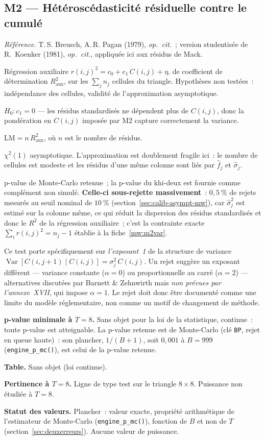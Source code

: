 \documentclass[a4paper,11pt]{article}
\newcommand{\code}[1]{\texttt{\small #1}}
\newcommand{\refl}[1]{{\small\textcolor{maincolor!70!black}{\textit{Référence.} #1}}\par\smallskip}
\newcounter{ficheid}
\newenvironment{fiche}[1]{%
  \stepcounter{ficheid}%
  \phantomsection
  \subsection{#1}%
  \label{fiche:\theficheid}%
}{%
  \end{description}\vspace{0.5em}%
}
\newcommand{\Cadre}{%
  \begin{description}[leftmargin=0pt, style=unboxed, itemsep=3pt, topsep=3pt, parsep=2pt]%
  \item[\textcolor{financeblue}{\textbf{1. Cadre, notations et hypothèses de validité (non testées).}}]}
\newcommand{\Hzero}{\item[\textcolor{financeblue}{\textbf{2. Hypothèse nulle.}}]}
\newcommand{\Stat}{\item[\textcolor{financeblue}{\textbf{3. Statistique de test.}}]}
\newcommand{\Loi}{\item[\textcolor{financeblue}{\textbf{4. Loi sous $H_0$.}}]}
\newcommand{\Pval}{\item[\textcolor{financeblue}{\textbf{5. p-value.}}]}
\newcommand{\Usage}{\item[\textcolor{financeblue}{\textbf{6. Usage et limites.}}]}
\newcommand{\Pertinence}{\item[\textcolor{financeblue}{\textbf{7. Pertinence et puissance à faible $T$.}}]}
\begin{document}
\begin{fiche}{M2 --- Hétéroscédasticité résiduelle contre le cumulé}
\label{mw:m2bp}
\refl{T.\,S. Breusch, A.\,R. Pagan (1979), \emph{op.\ cit.}~; version
studentisée de R.~Koenker (1981), \emph{op.\ cit.}, appliquée ici aux résidus de
Mack.}
\Cadre
Régression auxiliaire $r(i,j)^2 = c_0 + c_1\,C(i,j) + \eta$, de coefficient de
détermination $R^2_{\text{aux}}$, sur les $\sum_j n_j$ cellules du triangle.
Hypothèses non testées~: indépendance des cellules, validité de l'approximation
asymptotique.
\Hzero
$H_0 : c_1 = 0$ --- les résidus standardisés ne dépendent plus de $C(i,j)$, donc
la pondération en $C(i,j)$ imposée par M2 capture correctement la variance.
\Stat
$\mathrm{LM} = n\,R^2_{\text{aux}}$, où $n$ est le nombre de résidus.
\Loi
$\chi^2(1)$ asymptotique. L'approximation est doublement fragile ici~: le nombre
de cellules est modeste et les résidus d'une même colonne sont liés par
$\hat f_j$ et $\hat\sigma_j$.
\Pval
p-value de Monte-Carlo retenue~; la p-value du khi-deux est fournie comme
complément non simulé. \textbf{Celle-ci sous-rejette massivement}~: $0{,}5~\%$ de
rejets mesurés au seuil nominal de $10~\%$ (section~\ref{sec:calib-asympt-mw}),
car $\hat\sigma_j^2$ est estimé sur la colonne même, ce qui réduit la dispersion
des résidus standardisés et donc le $R^2$ de la régression auxiliaire~; c'est la
contrainte exacte $\sum_i r(i,j)^2 = n_j - 1$ établie à la fiche~\ref{mw:m2var}.
\Usage
Ce test porte spécifiquement sur \emph{l'exposant~1} de la structure de variance
$\operatorname{Var}[C(i,j+1)\mid C(i,j)] = \sigma_j^2\,C(i,j)$. Un rejet suggère
un exposant différent --- variance constante ($\alpha = 0$) ou proportionnelle au
carré ($\alpha = 2$) --- alternatives discutées par Barnett \& Zehnwirth mais
\emph{non prévues par l'annexe~XVII}, qui impose $\alpha = 1$. Le rejet doit donc
être documenté comme une limite du modèle réglementaire, non comme un motif de
changement de méthode.
\Pertinence
\textbf{p-value minimale à $T = 8$.} Sans objet pour la loi de la statistique, continue~: toute p-value est atteignable. La p-value retenue est de Monte-Carlo (clé \code{BP}, rejet en queue haute)~: son plancher, $1/(B+1)$, soit $0{,}001$ à $B = 999$ (\code{engine\_p\_mc()}), est celui de la p-value retenue.

\textbf{Table.} Sans objet (loi continue).

\textbf{Pertinence à $T = 8$.} Ligne de type test sur le triangle $8\times 8$. Puissance non étudiée à $T = 8$.

\textbf{Statut des valeurs.} Plancher~: valeur exacte, propriété arithmétique de l'estimateur de Monte-Carlo (\code{engine\_p\_mc()}), fonction de $B$ et non de $T$ (section~\ref{sec:deuxerreurs}). Aucune valeur de puissance.
\end{fiche}
\end{document}
